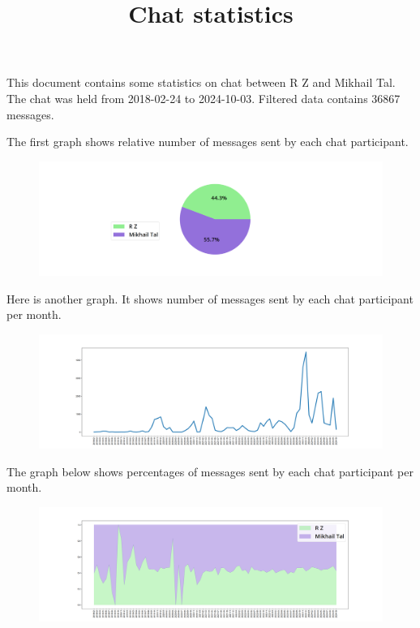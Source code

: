 \documentclass[10pt]{article}
\title{Chat statistics}
\begin{document}
    \maketitle
    This document contains some statistics on chat between R Z and Mikhail Tal.
    The chat was held from 2018-02-24 to 2024-10-03.
    Filtered data contains 36867 messages.
    
    The first graph shows relative number of messages sent by each chat participant.
    \begin{figure}[H]
        \includegraphics[width=1.1\textwidth]{pie_chart.png}
    \end{figure}
    
    Here is another graph. It shows number of messages sent by each chat participant per month.
    \begin{figure}[H]
        \includegraphics[width=1.1\textwidth]{chat_per_month.png}
    \end{figure}
    
    \newpage
    The graph below shows percentages of messages sent by each chat participant per month.
    \begin{figure}[H]
        \includegraphics[width=1.1\textwidth]{percentages_by_month.png}
    \end{figure}
    
\end{document}
